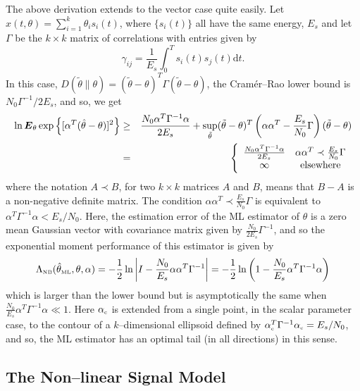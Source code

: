 \documentclass[11pt,epsf]{article}
\newcommand{\ttt}{\tilde{\theta}}
\newcommand{\ct}{\hat{\theta}}
\newcommand {\bE} {\mbox{\boldmath $E$}}
\begin{document}
The above derivation extends to the vector case quite easily. Let
$x(t,\theta)=\sum_{i=1}^k\theta_is_i(t)$, where $\{s_i(t)\}$ all have the same
energy, $E_s$ and let $\Gamma$ be the $k\times k$ matrix of correlations
with entries given by
\begin{equation}
\gamma_{ij}=\frac{1}{E_s}\int_0^Ts_i(t)s_j(t)\mbox{d}t.
\end{equation}
In this case, $D(\ttt\|\theta)=(\ttt-\theta)^T\Gamma(\ttt-\theta)$,
the Cram\'er--Rao lower bound is $N_0\Gamma^{-1}/2E_s$, and so, we get
\begin{eqnarray}
\ln\bE_\theta\exp\left\{[\alpha^T(\ct-\theta)]^2\right\}&\ge&
\frac{N_0\alpha^T\Gamma^{-1}\alpha}{2E_s}+\sup_{\ttt}
(\ttt-\theta)^T\left(\alpha\alpha^T-\frac{E_s}{N_0}\Gamma\right)(\ttt-\theta)\\
&=&\left\{\begin{array}{cc}
\frac{N_0\alpha^T\Gamma^{-1}\alpha}{2E_s} & \alpha\alpha^T \prec
\frac{E_s}{N_0}\Gamma\\
\infty & \mbox{elsewhere}\end{array}\right.
\end{eqnarray}
where the notation $A \prec B$, for two $k\times k$ matrices $A$ and $B$, means
that $B-A$ is a non-negative definite matrix.
The condition $\alpha\alpha^T \prec \frac{E_s}{N_0}\Gamma$ is equivalent to
$\alpha^T\Gamma^{-1}\alpha < E_s/N_0$. Here, the estimation error of the ML
estimator of $\theta$ is a zero mean Gaussian vector with covariance matrix
given by
$\frac{N_0}{2E_s}\Gamma^{-1}$, and so the exponential
moment performance of this estimator is given by
\begin{equation}
\Lambda_{\mbox{\tiny NB}}(\ct_{\mbox{\tiny ML}},\theta,\alpha)=
-\frac{1}{2}\ln\bigg|I-\frac{N_0}{E_s}\alpha\alpha^T\Gamma^{-1}\bigg|
=-\frac{1}{2}\ln\left(1-\frac{N_0}{E_s}
\alpha^T\Gamma^{-1}\alpha\right)
\end{equation}
which is larger than the lower bound but is asymptotically the same when
$\frac{N_0}{E_s}\alpha^T\Gamma^{-1}\alpha \ll 1$. Here $\alpha_{\mbox{\tiny
c}}$ is extended from a single point, in the scalar parameter case,
to the contour of a $k$--dimensional ellipsoid
defined by $\alpha_{\mbox{\tiny c}}^T\Gamma^{-1}\alpha_{\mbox{\tiny
c}}=E_s/N_0$, and so, the ML estimator has an optimal tail (in all directions) in
this sense.

\subsection{The Non--linear Signal Model}
\end{document}
